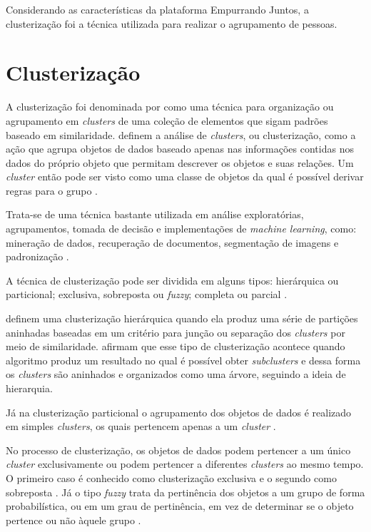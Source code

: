 Considerando as características da plataforma Empurrando Juntos, a clusterização foi a técnica utilizada para realizar o agrupamento de pessoas.


\section{Clusterização}
A clusterização foi denominada por  como uma técnica para organização ou agrupamento em \textit{clusters} 
de uma coleção de elementos que sigam padrões baseado em similaridade.
 definem a análise de \textit{clusters}, ou clusterização, como a ação que agrupa objetos de dados
baseado apenas nas informações contidas nos dados do próprio objeto que permitam descrever os objetos e suas relações. Um \textit{cluster}
então pode ser visto como uma classe de objetos da qual é possível derivar regras para o grupo \cite{han2011data}.

Trata-se de uma técnica bastante utilizada em análise exploratórias, agrupamentos, 
tomada de decisão e implementações de \textit{machine learning}, como:
mineração de dados, recuperação de documentos, segmentação de imagens e padronização \cite{clustering_review}.

A técnica de clusterização pode ser dividida em alguns tipos: hierárquica ou particional; exclusiva, sobreposta ou \textit{fuzzy}; 
completa ou parcial \cite{tan2013data, clustering_review}. 

 definem uma clusterização hierárquica quando ela produz uma série
de partições aninhadas baseadas em um critério para junção ou separação dos \textit{clusters} por meio de similaridade. 
 afirmam que esse tipo de clusterização acontece quando algoritmo
produz um resultado no qual é possível obter \textit{subclusters} e dessa forma os \textit{clusters} são aninhados
e organizados como uma árvore, seguindo a ideia de hierarquia.

Já na clusterização particional o agrupamento dos objetos de dados é realizado em simples \textit{clusters}, 
os quais pertencem apenas a um \textit{cluster} \cite{tan2013data}.

No processo de clusterização, os objetos de dados podem pertencer a um único \textit{cluster} exclusivamente ou podem
pertencer a diferentes \textit{clusters} ao mesmo tempo. 
O primeiro caso é conhecido como clusterização exclusiva e o segundo como sobreposta \cite{tan2013data}. 
Já o tipo \textit{fuzzy} trata da pertinência dos objetos a um grupo de forma probabilística, 
ou em um grau de pertinência, em vez de determinar se o objeto pertence ou não àquele grupo \cite{tan2013data, clustering_review}.

